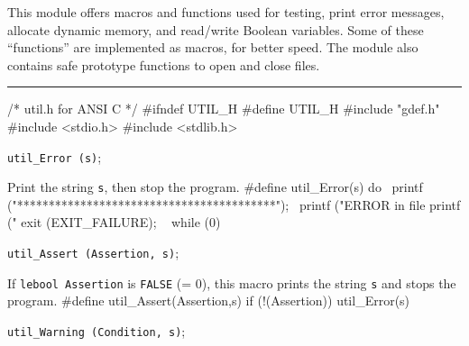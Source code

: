 
This module offers macros and functions used for testing, print error messages,
allocate dynamic memory, and read/write Boolean variables.
Some of these ``functions'' are implemented as macros, for better speed.
The module also contains safe prototype functions to open and close files.


\bigskip\hrule

\code\hide
/* util.h  for ANSI C */
#ifndef UTIL_H
#define UTIL_H
\endhide
#include "gdef.h"
#include <stdio.h>
#include <stdlib.h>
\endcode


\noindent 
{\tt util\_Error (s)};

 \tab  Print the string {\tt s}, then stop the program.
 \endtab
\code
\hide
#define util_Error(s) do { \
   printf ("\n\n******************************************\n"); \
   printf ("ERROR in file %
   printf ("%
   exit (EXIT_FAILURE); \
   } while (0)
\endhide
\endcode

\noindent 
{\tt util\_Assert (Assertion, s)};

 \tab  If {\tt lebool Assertion} is {\tt FALSE} (= 0), 
  this macro prints the string {\tt s} and stops the program.
 \endtab
\code
\hide
#define util_Assert(Assertion,s) if (!(Assertion)) util_Error(s)
\endhide
\endcode

\noindent 
{\tt util\_Warning (Condition, s)};

